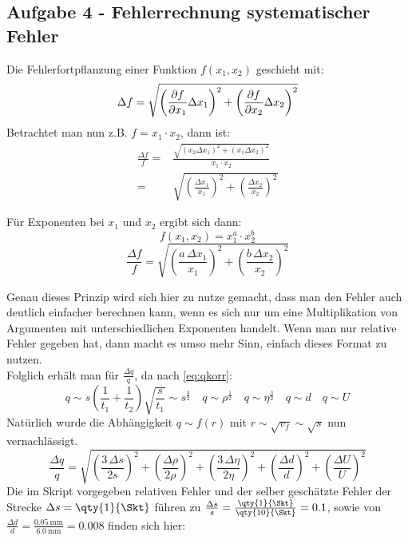 \subsection{Aufgabe 4 - Fehlerrechnung systematischer Fehler}
Die Fehlerfortpflanzung einer Funktion \(f(x_1,x_2)\) geschieht mit: 
\begin{equation}
    \Delta f=\sqrt{\left(\frac{\partial f}{\partial x_1}\Delta x_1\right)^2+\left(\frac{\partial f}{\partial x_2}\Delta x_2\right)^2}
\end{equation}
Betrachtet man nun z.B. \(f=x_1\cdot x_2\), dann ist:
\begin{equation}
    \begin{aligned}
    \frac{\Delta f}{f}=&\frac{\sqrt{\left(x_2 \Delta x_1\right)^2+\left(x_1 \Delta x_2\right)^2}}{x_1\cdot x_2}\\=&\sqrt{\left(\frac{\Delta x_1}{x_1}\right)^2+\left(\frac{\Delta x_2}{x_2}\right)^2}
    \end{aligned}
\end{equation}
\newpage

Für Exponenten bei \(x_1\) und \(x_2\) ergibt sich dann:
\[f(x_1, x_2) = x_1^a\cdot x_2^b\]
\begin{equation}
\frac{\Delta f}{f} =
\sqrt{
\left( \frac{a \, \Delta x_1}{x_1} \right)^2 +
\left( \frac{b \, \Delta x_2}{x_2} \right)^2
}
\end{equation}

Genau dieses Prinzip wird sich hier zu nutze gemacht, dass man den Fehler auch deutlich einfacher berechnen kann, wenn es sich nur um eine Multiplikation von Argumenten mit unterschiedlichen Exponenten handelt. Wenn man nur relative Fehler gegeben hat, dann macht es umso mehr Sinn, einfach dieses Format zu nutzen.\\
Folglich erhält man für \(\frac{\Delta q}{q}\), da nach \cref{eq:qkorr}:
\[q\sim s\left(\frac{1}{t_1}+\frac{1}{t_2}\right)\sqrt{\frac{s}{t_1}}\sim s^{\frac{3}{2}}\quad q\sim \rho^{\frac{1}{2}}\quad q\sim \eta^{\frac{3}{2}}\quad q\sim d\quad q\sim U\]  
Natürlich wurde die Abhängigkeit \(q\sim f(r) \text{ mit } r\sim \sqrt{v_f}\sim\sqrt{s}\) nun vernachlässigt.
\begin{equation}
\frac{\Delta q}{q} =
\sqrt{
\left( \frac{3 \, \Delta s}{2s} \right)^2 +
\left( \frac{\Delta \rho}{2\rho} \right)^2 +
\left( \frac{3 \, \Delta \eta}{2\eta} \right)^2 +
\left( \frac{\Delta d}{d} \right)^2 +
\left( \frac{\Delta U}{U} \right)^2}
\end{equation}
Die im Skript\autocite{Skript_1} vorgegeben relativen Fehler und der selber geschätzte Fehler der Strecke \(\Delta s=\qty{1}{\Skt}\) führen zu \(\frac{\Delta s}{s}=\frac{\qty{1}{\Skt}}{\qty{10}{\Skt}}=0.1\), sowie von \(\frac{\Delta d}{d}=\frac{\qty{0.05}{\milli\meter}}{\qty{6.0}{\milli\meter}}=0.008\) finden sich hier:

